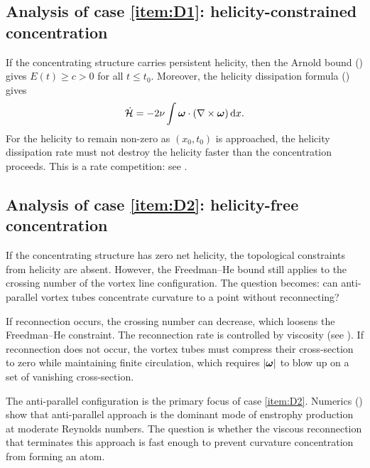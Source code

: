 \subsection{Analysis of case \ref{item:D1}: helicity-constrained concentration}

If the concentrating structure carries persistent helicity, then the Arnold bound
() gives $E(t) \geq c > 0$ for all $t \leq t_0$.
Moreover, the helicity dissipation formula ()
gives
\begin{equation}\label{eq:helicity-dissip-at-concentration}
  \dot{\mathcal{H}} = -2\nu\int \boldsymbol{\omega}\cdot(\nabla\times\boldsymbol{\omega})\,\mathrm{d} x.
\end{equation}
For the helicity to remain non-zero as $(x_0, t_0)$ is approached, the
helicity dissipation rate must not destroy the helicity faster than the
concentration proceeds.  This is a rate competition: see .

\subsection{Analysis of case \ref{item:D2}: helicity-free concentration}

If the concentrating structure has zero net helicity, the topological constraints
from helicity are absent.  However, the Freedman--He bound still applies to the
crossing number of the vortex line configuration.  The question becomes: can
anti-parallel vortex tubes concentrate curvature to a point without reconnecting?

If reconnection occurs, the crossing number can decrease, which loosens the
Freedman--He constraint.  The reconnection rate is controlled by viscosity
(see ).  If reconnection does not occur, the vortex
tubes must compress their cross-section to zero while maintaining finite
circulation, which requires $\left\lvert \boldsymbol{\omega} \right\rvert$ to blow up on a set of vanishing
cross-section.

\begin{remark}\label{rem:anti-parallel}
  The anti-parallel configuration is the primary focus of case \ref{item:D2}.
  Numerics () show that anti-parallel approach is the
  dominant mode of enstrophy production at moderate Reynolds numbers.  The
  question is whether the viscous reconnection that terminates this approach
  is fast enough to prevent curvature concentration from forming an atom.
\end{remark}

